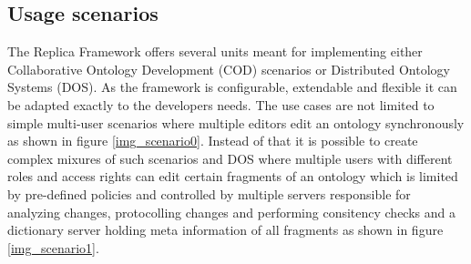 \subsection{Usage scenarios}
The Replica Framework offers several units meant for implementing either
Collaborative Ontology Development (COD) scenarios or Distributed Ontology
Systems (DOS). As the framework is configurable, extendable and flexible
it can be adapted exactly to the developers needs. The use cases are not
limited to simple multi-user scenarios where multiple editors edit an
ontology synchronously as shown in figure \ref{img_scenario0}.
Instead of that it is possible to create complex
mixures of such scenarios and DOS where multiple
users with different roles and access rights can edit certain fragments
of an ontology which is limited by pre-defined policies and controlled by
multiple servers responsible for analyzing changes, protocolling changes
and performing consitency checks and a dictionary server holding meta
information of all fragments as shown in figure \ref{img_scenario1}.
